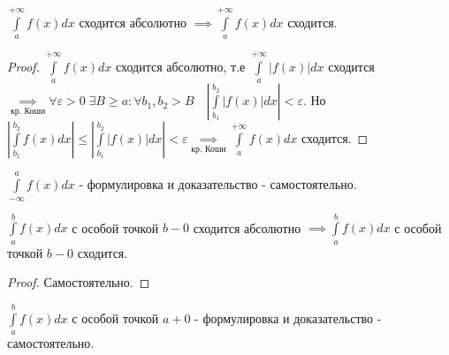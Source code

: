 \documentclass[../main.tex]{subfiles}
\begin{document}
\begin{theorem}
    $\int\limits_{a }^{+\infty}f(x)dx$ сходится абсолютно $\implies \int\limits_{a  }^{+\infty}f(x)dx $ сходится.    
\end{theorem}
\begin{proof}
    $\int\limits_{a }^{+\infty}f(x)dx$ сходится абсолютно, т.е $\int\limits_{a  }^{+\infty}|f(x)|dx $ сходится $\underset{\text{кр. Коши}}{\implies} \forall \varepsilon>0 \; \exists B \geqslant a: \forall b_{1},b_{2}> B \quad \left| \int\limits_{b_{1}     }^{b_{2}}|f(x)|dx\right|<\varepsilon $. Но $\left| \int\limits_{ b_{1}}^{b_{2}}f(x) dx\right|\leqslant \left| \int\limits_{b_{1}}^{b_{2}}|f(x)|dx \right| <\varepsilon\underset{\text{кр. Коши}}{\implies} \int\limits_{a    }^{+\infty}f(x)dx $ сходится.
\end{proof}
$\int\limits_{-\infty}^{a} f(x)dx$ - формулировка и доказательство - самостоятельно.
\begin{theorem}
    $\int\limits_{a }^{b}f(x)dx $ с особой точкой $b-0$ сходится абсолютно $\implies \int\limits_{a }^{b    } f(x)dx$ с особой точкой $b-0$ сходится.
\end{theorem}
\begin{proof}
    Самостоятельно.
\end{proof}
$\int\limits_{a }^{b    } f(x)dx $ с особой точкой $a+0$ - формулировка и доказательство - самостоятельно.
\end{document}
